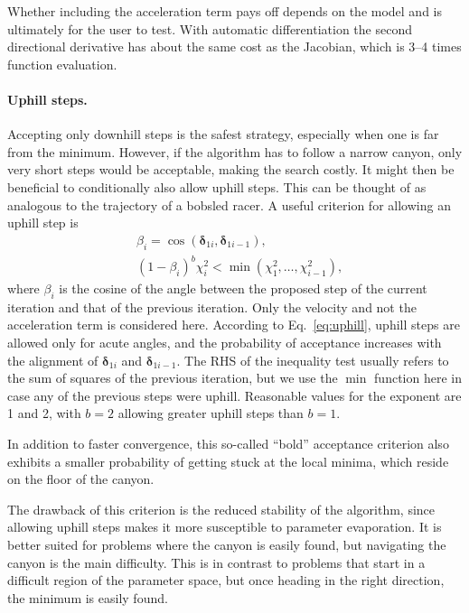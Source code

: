 \documentclass{article}
\begin{document}
Whether including the acceleration term pays off depends on the model and is ultimately for the user to test. With automatic differentiation the second directional derivative has about the same cost as the Jacobian, which is 3--4 times function evaluation.

\paragraph{Uphill steps.} Accepting only downhill steps is the safest strategy, especially when one is far from the minimum. However, if the algorithm has to follow a narrow canyon, only very short steps would be acceptable, making the search costly. It might then be beneficial to conditionally also allow uphill steps. This can be thought of as analogous to the trajectory of a bobsled racer. A useful criterion for allowing an uphill step is
\begin{equation}
  \label{eq:uphill}
  \begin{split}
    & \beta_i = \cos(\bm\delta_{1i},\bm\delta_{1i-1}), \\
    & (1-\beta_i)^b\chi_i^2 < \min(\chi_1^2,\ldots,\chi_{i-1}^2),
  \end{split}
\end{equation}
where $\beta_i$ is the cosine of the angle between the proposed step of the current iteration and that of the previous iteration. Only the velocity and not the acceleration term is considered here. According to Eq.~\eqref{eq:uphill}, uphill steps are allowed only for acute angles, and the probability of acceptance increases with the alignment of $\bm\delta_{1i}$ and $\bm\delta_{1i-1}$. The RHS of the inequality test usually refers to the sum of squares of the previous iteration, but we use the $\min$ function here in case any of the previous steps were uphill. Reasonable values for the exponent are 1 and 2, with $b=2$ allowing greater uphill steps than $b=1$.

In addition to faster convergence, this so-called ``bold'' acceptance criterion also exhibits a smaller probability of getting stuck at the local minima, which reside on the floor of the canyon.

The drawback of this criterion is the reduced stability of the algorithm, since allowing uphill steps makes it more susceptible to parameter evaporation. It is better suited for problems where the canyon is easily found, but navigating the canyon is the main difficulty. This is in contrast to problems that start in a difficult region of the parameter space, but once heading in the right direction, the minimum is easily found.
\end{document}
